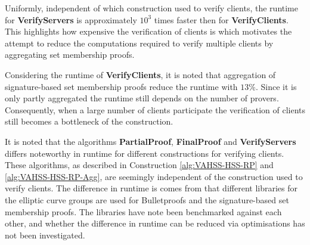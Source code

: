 Uniformly, independent of which construction used to verify clients, the runtime for \textbf{VerifyServers} is approximately $10^3$ times faster then for \textbf{VerifyClients}.  This highlights how expensive the verification of clients is which motivates the attempt to reduce the computations required to verify multiple clients by aggregating set membership proofs. 

Considering the runtime of \textbf{VerifyClients}, it is noted that aggregation of signature-based set membership proofs reduce the runtime with $13\%$. Since it is only partly aggregated the runtime still depends on the number of provers. Consequently, when a large number of clients participate the verification of clients still becomes a bottleneck of the construction. 


It is noted that the algorithms \textbf{PartialProof}, \textbf{FinalProof} and \textbf{VerifyServers} differs noteworthy in runtime for different constructions for verifying clients. These algorithms, as described in Construction \ref{alg:VAHSS-HSS-RP} and \ref{alg:VAHSS-HSS-RP-Agg}, are seemingly independent of the construction used to verify clients. The  difference in runtime is comes from that different libraries for the elliptic curve groups are used for Bulletproofs and the signature-based set membership proofs. %
The libraries have note been benchmarked against each other, and whether the difference in runtime can be reduced via optimisations has not been investigated.








